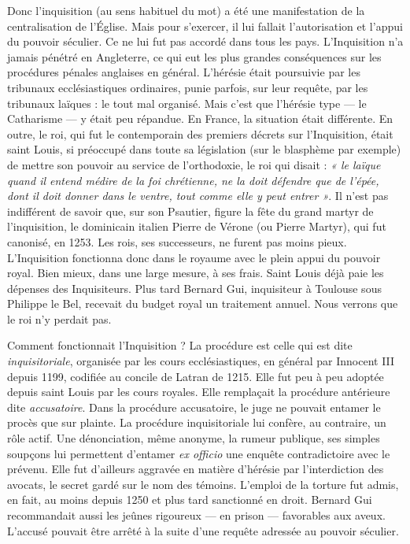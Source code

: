 \documentclass[french,twoside]{book} %
\begin{document}
Donc l’inquisition (au sens habituel du mot) a été une manifestation de la centralisation de l’Église. Mais pour s’exercer, il lui fallait l’autorisation et l’appui du pouvoir séculier. Ce ne lui fut pas accordé dans tous les pays. L’Inquisition n’a jamais pénétré en Angleterre, ce qui eut les plus grandes conséquences sur les procédures pénales anglaises en général. L’hérésie était poursuivie par les tribunaux ecclésiastiques ordinaires, punie parfois, sur leur requête, par les tribunaux laïques : le tout mal organisé. Mais c’est que l’hérésie type — le Catharisme — y était peu répandue. En France, la situation était différente. En outre, le roi, qui fut le contemporain des premiers décrets sur l’Inquisition, était saint Louis, si préoccupé dans toute sa législation (sur le blasphème par exemple) de mettre son pouvoir au service de l’orthodoxie, le roi qui disait : \emph{« le laïque quand il entend médire de la foi chrétienne, ne la doit défendre que de l’épée, dont il doit donner dans le ventre, tout comme elle y peut entrer »}. Il n’est pas indifférent de savoir que, sur son Psautier, figure la fête du grand martyr de l’inquisition, le dominicain italien Pierre de Vérone (ou Pierre Martyr), qui fut canonisé, en 1253. Les rois, ses successeurs, ne furent pas moins pieux. L’Inquisition fonctionna donc dans le royaume avec le plein appui du pouvoir royal. Bien mieux, dans une large mesure, à ses frais. Saint Louis déjà paie les dépenses des Inquisiteurs. Plus tard Bernard Gui, inquisiteur à Toulouse sous Philippe le Bel, recevait du budget royal un traitement annuel. Nous verrons que le roi n’y perdait pas.\par
Comment fonctionnait l’Inquisition ? La procédure est celle qui est dite \emph{inquisitoriale}, organisée par les cours ecclésiastiques, en général par Innocent III depuis 1199, codifiée au concile de Latran de 1215. Elle fut peu à peu adoptée depuis saint Louis par les cours royales. Elle remplaçait la procédure antérieure dite \emph{accusatoire}. Dans la procédure accusatoire, le juge ne pouvait entamer le procès que sur plainte. La procédure inquisitoriale lui confère, au contraire, un rôle actif. Une dénonciation, même anonyme, la rumeur publique, ses simples soupçons lui permettent d’entamer \emph{ex officio} une enquête contradictoire avec le prévenu. Elle fut d’ailleurs aggravée en matière d’hérésie par l’interdiction des avocats, le secret gardé sur le nom des témoins. L’emploi de la torture fut admis, en fait, au moins depuis 1250 et plus tard sanctionné en droit. Bernard Gui recommandait aussi les jeûnes rigoureux — en prison — favorables aux aveux. L’accusé pouvait être arrêté à la suite d’une requête adressée au pouvoir séculier.\par
\end{document}
